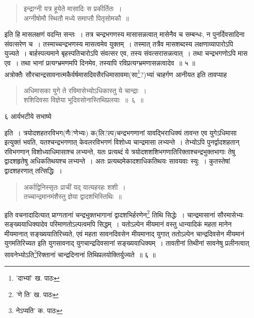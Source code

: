 \documentclass[11pt, openany]{book}
\begin{document}
\begin{quote}
{\qt इन्द्राग्नी यत्र हूयेते मासादिः स प्रकीर्तितः~।\\
अग्नीषोमौ स्थितौ मध्ये समाप्तौ पितृसोमकौ~॥}
\end{quote}

\noindent इति हि मासलक्षणं वदन्ति सन्तः~। तत्र चन्द्रभगणस्य मासासन्नत्वात् मासेनैव च सम्बन्धः, न पुनर्दिवसादिना संवत्सरेण च~। तस्माच्चन्द्रभणस्य मासत्वमेव युक्तम्~। तस्मात् तत्रैव मासशब्दस्य लक्षणाव्यापारोऽपि युज्यते~। बार्हस्पत्यमाने बृहस्पतिचारोऽपि संवत्सर एव, तस्य संवत्सरासन्नत्वात्~। तथा चन्द्रभगणोऽपि मास एव~। तथा भानां प्रत्यग्भ्रमणमपि दिनमेव, तस्यापि रविप्रत्यग्भ्रमणासन्नत्वादेव~॥ ५ ॥\\

अत्रोक्तैः सौरचान्द्रसावनात्मकैर्वर्षमासदिवसैरधिमासावमा(सा\renewcommand{\thefootnote}{६}\footnote{'दाभ्यां' ख. पाठः}?)भ्यां चाहर्गण आनीयत इति तावप्याह\textendash

\begin{quote}
{\ab अधिमासका युगे ते रविमासेभ्योऽधिकास्तु ये चान्द्राः~।\\
शशिदिवसा विज्ञेया भूदिवसोनास्तिथिप्रलयाः~॥~६~॥}
\end{quote}

\newpage

\vspace{3cm}६ \hspace{4cm} आर्यभटीये सभाष्ये

\vspace{0.3cm}
\noindent इति~। त्रयोदशहतरविभग(णैः?णेभ्यः) क(लि?ल्प)चन्द्रभगणानां यावद्भिराधिक्यं तावन्त एव युगेऽधिमासा इत्युक्तं भवति, यतश्चन्द्रभगणात् केवलरविभगणं विशोध्य चान्द्रमासा लभ्यन्ते~। तेभ्योऽपि पुनर्द्वादशहतान् रविभगणान् विशोध्याधिमासाश्च लभ्यन्ते, यतः प्रत्यब्दं ये त्रयोदशशशिभगणातिरिक्ताश्चन्द्रभुक्तभागाः तेषु द्वादशहृतेषु अधिकतिथयश्च लभ्यन्ते~। अतः प्रत्यब्दमेकादशाधिकतिथयः सावयवाः स्युः~। कुतस्तेषां द्वादशहरणात् तत्सिद्धिः~।

\begin{quote}
{\qt अर्काद्विनिस्सृतः प्राचीं यद् यात्यहरहः शशी~।\\
    तच्चान्द्रमानमंशैस्तु ज्ञेया द्वादशभिस्तिथिः~॥}
\end{quote}

\noindent इति वचनादादित्यात् प्राग्गतानां चन्द्रभुक्तभागानां द्वादशभिर्हरणेन\renewcommand{\thefootnote}{१}\footnote{'णे ति' ख. पाठः} तिथि सिद्धेः~। चान्द्रमासानां सौरमासेभ्यः सङ्ख्ययाधिक्यादेव परिमाणतोऽल्पत्वमपि सिद्धम्~। यतोऽल्पेन मीयमानं वस्तु धान्यादिकं महता मानेन मीयमानात् सङ्ख्ययातिरिच्यते, एवं महता सावनदिवसेन मीयमानाद् युगात् ततोऽल्पेन चान्द्रदिवसेन मीयमानं युगमतिरिच्यत इति युगसावनाद् युगचान्द्रदिवसानां सङ्ख्ययाधिक्यम्~। तावतीनां तिथीनां सावनेषु प्रलीनत्वात् सावनेभ्योऽति\renewcommand{\thefootnote}{२}\footnote{नेऽप्यति' क. पाठः}रिक्तानां चान्द्रदिनानां तिथिप्रलयोक्तिर्युज्यते~॥ ६ ॥ \\
\end{document}
